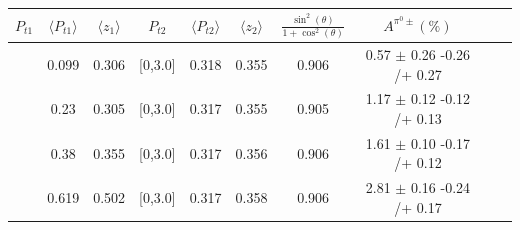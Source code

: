 \begin{table}[H]\scriptsize
\centering
\begin{tabular}{|c| c| c| c| c| c| c| c| c| c|}
\hline
$P_{t1}$   & $\langle  P_{t1}  \rangle$ & $\langle  z_1 \rangle$& $P_{t2}$  & $\langle  P_{t2}\rangle$  &  $\langle  z_2 \rangle$  &$\frac{\sin^2(\theta)}{1+\cos^2(\theta)}$&  $A^{\pi^0\pm}(\%)$  \\ \hline
[0,0.15]	&	0.099	&	0.306	&	[0,3.0]	&	0.318	&	0.355	&	0.906	&	0.57	$\pm$ 	0.26	-0.26	/+	0.27	\\ \hline
[0.15,0.3]	&	0.23	        &	0.305	&	[0,3.0]	&	0.317	&	0.355	&	0.905	&	1.17	$\pm$	0.12	-0.12	/+	0.13	\\ \hline
[0.3,0.5]	&	0.38	        &	0.355	&	[0,3.0]	&	0.317	&	0.356	&	0.906	&	1.61	$\pm$	0.10	-0.17	/+	0.12	\\ \hline
[0.5,3.0]	&	0.619	&	0.502	&	[0,3.0]	&	0.317	&	0.358	&	0.906	&	2.81	$\pm$	0.16	-0.24	/+	0.17	\\ \hline
														

\end{tabular}
\end{table}
